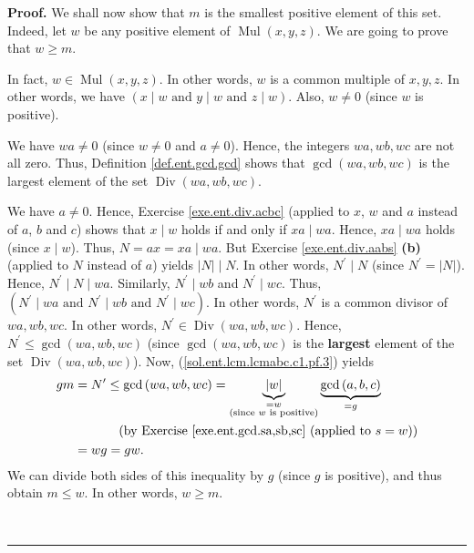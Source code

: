 \documentclass[numbers=enddot,12pt,final,onecolumn,notitlepage]{scrartcl}%
\numberwithin{exer}{subsection}
\theoremstyle{definition}
\newenvironment{fineprint}{\begin{small}}{\end{small}}
\newenvironment{proof}[1][Proof]{\noindent\textbf{#1.} }{\ \rule{0.5em}{0.5em}}
\begin{document}
\begin{fineprint}
\begin{proof}
We shall now show that $m$ is the smallest positive element of this set.
Indeed, let $w$ be any positive element of $\operatorname*{Mul}\left(
x,y,z\right)  $. We are going to prove that $w\geq m$.

In fact, $w\in\operatorname*{Mul}\left(  x,y,z\right)  $. In other words, $w$
is a common multiple of $x,y,z$. In other words, we have $\left(  x\mid
w\text{ and }y\mid w\text{ and }z\mid w\right)  $. Also, $w\neq0$ (since $w$
is positive).

We have $wa\neq0$ (since $w\neq0$ and $a\neq0$). Hence, the integers
$wa,wb,wc$ are not all zero. Thus, Definition \ref{def.ent.gcd.gcd} shows that
$\gcd\left(  wa,wb,wc\right)  $ is the largest element of the set
$\operatorname*{Div}\left(  wa,wb,wc\right)  $.

We have $a\neq0$. Hence, Exercise \ref{exe.ent.div.acbc} (applied to $x$, $w$
and $a$ instead of $a$, $b$ and $c$) shows that $x\mid w$ holds if and only if
$xa\mid wa$. Hence, $xa\mid wa$ holds (since $x\mid w$). Thus, $N=ax=xa\mid
wa$. But Exercise \ref{exe.ent.div.aabs} \textbf{(b)} (applied to $N$ instead
of $a$) yields $\left\vert N\right\vert \mid N$. In other words, $N^{\prime
}\mid N$ (since $N^{\prime}=\left\vert N\right\vert $). Hence, $N^{\prime}\mid
N\mid wa$. Similarly, $N^{\prime}\mid wb$ and $N^{\prime}\mid wc$. Thus,
$\left(  N^{\prime}\mid wa\text{ and }N^{\prime}\mid wb\text{ and }N^{\prime
}\mid wc\right)  $. In other words, $N^{\prime}$ is a common divisor of
$wa,wb,wc$. In other words, $N^{\prime}\in\operatorname*{Div}\left(
wa,wb,wc\right)  $. Hence, $N^{\prime}\leq\gcd\left(  wa,wb,wc\right)  $
(since $\gcd\left(  wa,wb,wc\right)  $ is the \textbf{largest} element of the
set $\operatorname*{Div}\left(  wa,wb,wc\right)  $). Now,
(\ref{sol.ent.lcm.lcmabc.c1.pf.3}) yields%
\begin{align*}
gm  &  =N^{\prime}\leq\gcd\left(  wa,wb,wc\right)  =\underbrace{\left\vert
w\right\vert }_{\substack{=w\\\text{(since }w\text{ is positive)}%
}}\underbrace{\gcd\left(  a,b,c\right)  }_{=g}\\
&  \ \ \ \ \ \ \ \ \ \ \left(  \text{by Exercise \ref{exe.ent.gcd.sa,sb,sc}
(applied to }s=w\text{)}\right) \\
&  =wg=gw.
\end{align*}
We can divide both sides of this inequality by $g$ (since $g$ is positive),
and thus obtain $m\leq w$. In other words, $w\geq m$.


\end{proof}
\end{fineprint}
\end{document}

